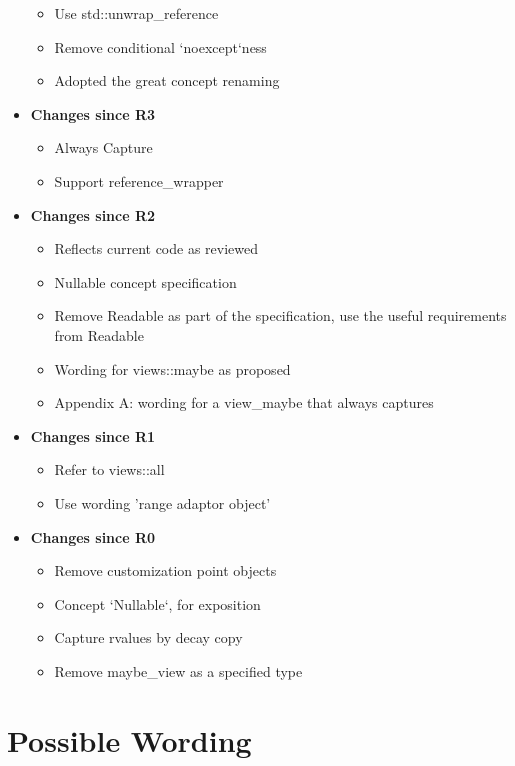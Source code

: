 \documentclass[a4paper,10pt,oneside,openany,final,article]{memoir}
\begin{document}
\begin{itemize}
\begin{itemize}
  \item Use std::unwrap\_reference
  \item Remove conditional `noexcept`ness
  \item Adopted the great concept renaming
  \end{itemize}
\item \textbf{Changes since R3}
  \begin{itemize}
  \item Always Capture
  \item Support reference\_wrapper
  \end{itemize}
\item \textbf{Changes since R2}
  \begin{itemize}
  \item Reflects current code as reviewed
  \item Nullable concept specification
  \item Remove Readable as part of the specification, use the useful requirements from Readable
  \end{itemize}
  \begin{itemize}
  \item Wording for views::maybe as proposed
  \item Appendix A: wording for a view\_maybe that always captures
  \end{itemize}
\item \textbf{Changes since R1}
  \begin{itemize}
  \item Refer to views::all
  \item Use wording 'range adaptor object'
  \end{itemize}
\item \textbf{Changes since R0}
  \begin{itemize}
  \item Remove customization point objects
  \item Concept `Nullable`, for exposition
  \item Capture rvalues by decay copy
  \item Remove maybe\_view as a specified type
  \end{itemize}
\end{itemize}

\renewcommand{\bibname}{References}



\nocite{viewmayb27:online}
\nocite{P3091R2}

\chapter{Possible Wording}

\begin{auxwording}



\end{auxwording}
\end{document}
